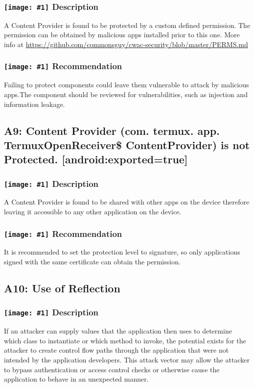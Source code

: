 \documentclass[12p]{article}
\newcommand{\icon}[1]{\texttt{[image: \#1]}}
\begin{document}
\subsubsection*{\protect\icon{/home/miki/Documents/GITHUB/AndroidPermissions/python/vulns/report_icons/basic_sheet.png} Description}
A Content Provider is found to be protected by a custom defined permission. The permission can be obtained by malicious apps installed prior to this one. More info at \url{https://github.com/commonsguy/cwac-security/blob/master/PERMS.md}
\subsubsection*{\protect\icon{/home/miki/Documents/GITHUB/AndroidPermissions/python/vulns/report_icons/basic_todo.png} Recommendation}
Failing to protect components could leave them vulnerable to attack by malicious apps.The component should be reviewed for vulnerabilities, such as injection and information leakage. 
\subsection{A9: Content Provider (com. termux. app. TermuxOpenReceiver\$ ContentProvider) is not Protected. [android:exported=true]}
\subsubsection*{\protect\icon{/home/miki/Documents/GITHUB/AndroidPermissions/python/vulns/report_icons/basic_sheet.png} Description}
A Content Provider is found to be shared with other apps on the device therefore leaving it accessible to any other application on the device.
\subsubsection*{\protect\icon{/home/miki/Documents/GITHUB/AndroidPermissions/python/vulns/report_icons/basic_todo.png} Recommendation}
It is recommended to set the protection level to signature, so only applications signed with the same certificate can obtain the permission.
\subsection{A10: Use of Reflection}
\subsubsection*{\protect\icon{/home/miki/Documents/GITHUB/AndroidPermissions/python/vulns/report_icons/basic_sheet.png} Description}
If an attacker can supply values that the application then uses to determine which class to instantiate or which method to invoke, the potential exists for the attacker to create control flow paths through the application that were not intended by the application developers. This attack vector may allow the attacker to bypass authentication or access control checks or otherwise cause the application to behave in an unexpected manner. 
\end{document}
